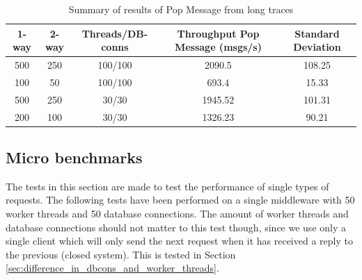 \documentclass{article}
\begin{document}
            \begin{table}[H]
                \caption{Summary of results of Pop Message from long traces}
                \label{table:long_trace_test_summary_popmessage}
                \begin{adjustwidth}{-2cm}{}
                    \begin{tabular}{|c|c|c|c|c|}
                        \hline 
                        \textbf{1-way} & \textbf{2-way} & \textbf{Threads/DB-conns} & \textbf{Throughput Pop Message (msgs/s)} & \textbf{Standard Deviation} \\ 
                        \hline 
                        500 & 250 & 100/100 &2090.5 &108.25\\
                        \hline
                        100 & 50 & 100/100 &693.4 &15.33\\
                        \hline 
                        500 & 250 & 30/30 &1945.52 &101.31\\
                        \hline
                        200 & 100 & 30/30 &1326.23 &90.21\\
                        \hline
                    \end{tabular} 
                \end{adjustwidth}
            \end{table}

        \subsection{Micro benchmarks}
            The tests in this section are made to test the performance of single types of requests. The following tests have been performed on a single middleware with 50 worker threads and 50 database connections. The amount of worker threads and database connections should not matter to this test though, since we use only a single client which will only send the next request when it has received a reply to the previous (closed system). This is tested in Section \ref{sec:difference_in_dbcons_and_worker_threads}.
\end{document}
